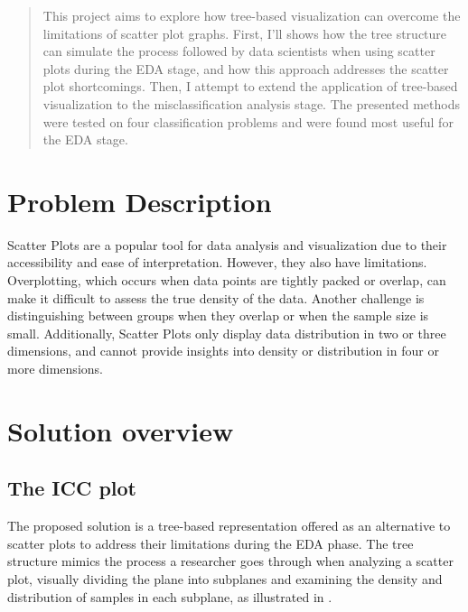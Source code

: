 \documentclass[11pt]{article}
\begin{document}
\maketitle

\begin{abstract}
This project aims to explore how tree-based visualization can overcome the limitations of scatter plot graphs. First, I'll shows how the tree structure can simulate the process followed by data scientists when using scatter plots during the EDA stage, and how this approach addresses the scatter plot shortcomings. Then, I attempt to extend the application of tree-based visualization to the misclassification analysis stage. The presented methods were tested on four classification problems and were found most useful for the EDA stage.
\end{abstract}
\section{Problem Description}\label{Problem Description}
Scatter Plots are a popular tool for data analysis and visualization due to their accessibility and ease of interpretation. However, they also have limitations. Overplotting, which occurs when data points are tightly packed or overlap, can make it difficult to assess the true density of the data. Another challenge is distinguishing between groups when they overlap or when the sample size is small. Additionally, Scatter Plots only display data distribution in two or three dimensions, and cannot provide insights into density or distribution in four or more dimensions.
\section{Solution overview}\label{Solution overview}
\subsection{The ICC plot}\label{The ICC plot}
The proposed solution is a tree-based representation offered as an alternative to scatter plots to address their limitations during the EDA phase. The tree structure mimics the process a researcher goes through when analyzing a scatter plot, visually dividing the plane into subplanes and examining the density and distribution of samples in each subplane, as illustrated in .
\end{document}
